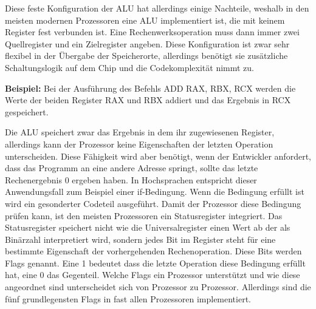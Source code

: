 \documentclass[12pt]{article}
\begin{document}
\noindent Diese feste Konfiguration der ALU hat allerdings einige Nachteile, weshalb in den meisten modernen Prozessoren eine ALU implementiert ist, die mit keinem Register fest verbunden ist. Eine Rechenwerksoperation muss dann immer zwei Quellregister und ein Zielregister angeben. Diese Konfiguration ist zwar sehr flexibel in der Übergabe der Speicherorte, allerdings benötigt sie zusätzliche Schaltungslogik auf dem Chip und die Codekomplexität nimmt zu.

\par\bigskip
\noindent \textbf{Beispiel:} Bei der Ausführung des Befehls ADD RAX, RBX, RCX werden die Werte der beiden Register RAX und RBX addiert und das Ergebnis in RCX gespeichert.

\par\smallskip\noindent Die ALU speichert zwar das Ergebnis in dem ihr zugewiesenen Register, allerdings kann der Prozessor keine Eigenschaften der letzten Operation unterscheiden. Diese Fähigkeit wird aber benötigt, wenn der Entwickler anfordert, dass das Programm an eine andere Adresse springt, sollte das letzte Rechenergebnis 0 ergeben haben. In Hochsprachen entspricht dieser Anwendungsfall zum Beispiel einer if-Bedingung. Wenn die Bedingung erfüllt ist wird ein gesonderter Codeteil ausgeführt. Damit der Prozessor diese Bedingung prüfen kann, ist den meisten Prozessoren ein Statusregister integriert. Das Statusregister speichert nicht wie die Universalregister einen Wert ab der als Binärzahl interpretiert wird, sondern jedes Bit im Register steht für eine bestimmte Eigenschaft der vorhergehenden Rechenoperation. Diese Bits werden Flags genannt. Eine 1 bedeutet dass die letzte Operation diese Bedingung erfüllt hat, eine 0 das Gegenteil. Welche Flags ein Prozessor unterstützt und wie diese angeordnet sind unterscheidet sich von Prozessor zu Prozessor. Allerdings sind die fünf grundlegensten Flags in fast allen Prozessoren implementiert.
\end{document}
